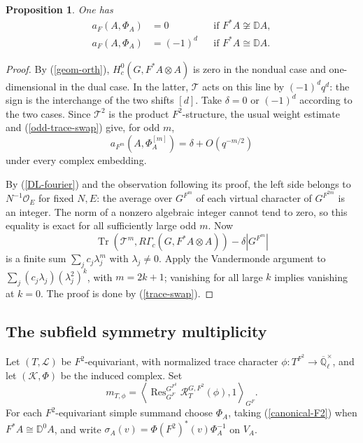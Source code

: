 \documentclass[11pt,letterpaper]{amsart}
\newtheorem{proposition}[theorem]{Proposition}
\theoremstyle{definition}
\numberwithin{equation}{section}
\numberwithin{theorem}{section}
\begin{document}
\begin{proposition}\label{F2-simple}
One has
\[
\begin{aligned}
 a_F(A,\Phi_A)&=0&&\text{if }F^*A\not\cong\mathbb DA,\\
 a_F(A,\Phi_A)&=(-1)^d
       &&\text{if }F^*A\cong\mathbb DA.
\end{aligned}
\]
\end{proposition}
\begin{proof}
By (\ref{geom-orth}), $H_c^0(G,F^*A\otimes A)$ is zero in the
nondual case and one-dimensional in the dual case. In the latter,
$\mathcal T$ acts on this line by $(-1)^dq^d$: the sign is the
interchange of the two shifts $[d]$. Take $\delta=0$ or $(-1)^d$
according to the two cases. Since $\mathcal T^2$ is the product
$F^2$-structure, the usual weight estimate and
(\ref{odd-trace-swap}) give, for odd $m$,
\[
 a_{F^m}(A,\Phi_A^{[m]})=\delta+O(q^{-m/2})
\]
under every complex embedding.

By (\ref{DL-fourier}) and the observation following its proof,
the left side belongs to $N^{-1}\mathcal O_E$ for fixed $N,E$:
the average over $G^{F^m}$ of each virtual character of $G^{F^{2m}}$
is an integer. The norm of a nonzero algebraic integer cannot
tend to zero, so this equality is exact for all sufficiently
large odd $m$. Now
\[
 \operatorname{Tr}(\mathcal T^m,R\Gamma_c(G,F^*A\otimes A))
                         -\delta|G^{F^m}|
\]
is a finite sum $\sum_jc_j\lambda_j^m$ with $\lambda_j\ne0$.
Apply the Vandermonde argument to
$\sum_j(c_j\lambda_j)(\lambda_j^2)^k$, with $m=2k+1$;
vanishing for all large $k$ implies vanishing at $k=0$.
The proof is done by (\ref{trace-swap}).
\end{proof}

\subsection{The subfield symmetry multiplicity }
Let $(T,\mathcal L)$ be $F^2$-equivariant, with normalized trace character
$\phi:T^{F^2}\to\overline{\mathbb Q}_\ell^\times$, and let
$(\mathcal K,\Phi)$ be the induced complex. Set
\[
 m_{T,\phi}=\left\langle
 \operatorname{Res}_{G^F}^{G^{F^2}}\mathcal R_T^{G,F^2}(\phi),1
 \right\rangle_{G^F}.
\]
For each $F^2$-equivariant simple summand choose $\Phi_A$, taking
(\ref{canonical-F2}) when $F^*A\cong\mathbb D^0A$, and write
$\sigma_A(v)=\Phi(F^2)^*(v)\Phi_A^{-1}$ on $V_A$.
\end{document}
